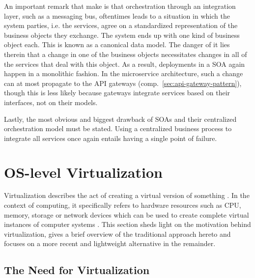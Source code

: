 An important remark that \citeauthor{cerny2018contextual} make is that orchestration through an integration layer, such as a messaging bus, oftentimes leads to a situation in which the system parties, i.e. the services, agree on a standardized representation of the business objects they exchange. The system ends up with one kind of business object each. This is known as a canonical data model. The danger of it lies therein that a change in one of the business objects necessitates changes in all of the services that deal with this object. As a result, deployments in a \ac{SOA} again happen in a monolithic fashion. In the microservice architecture, such a change can at most propagate to the \acs{API} gateways (comp.~\autoref{sec:api-gateway-pattern}), though this is less likely because gateways integrate services based on their interfaces, not on their models.

Lastly, the most obvious and biggest drawback of \acp{SOA} and their centralized orchestration model must be stated. Using a centralized business process to integrate all services once again entails having a single point of failure.


\section{OS-level Virtualization}
\label{sec:os-level-virtualization}

Virtualization describes the act of creating a virtual version of something \cite[p.~2]{celesti2016exploring}. In the context of computing, it specifically refers to hardware resources such as \acs{CPU}, memory, storage or network devices which can be used to create complete virtual instances of computer systems \cite[p.~21]{da2018containers}. This section sheds light on the motivation behind virtualization, gives a brief overview of the traditional approach hereto and focuses on a more recent and lightweight alternative in the remainder.


\subsection{The Need for Virtualization}
\label{sec:virtualization-motivation}

